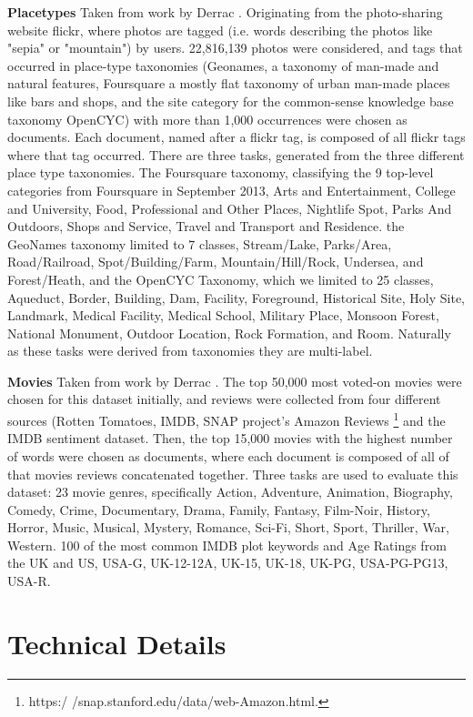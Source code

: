 \textbf{Placetypes} Taken from work by Derrac \cite{Derrac2015}. Originating from the photo-sharing website flickr, where photos are tagged (i.e. words describing the photos like "sepia" or "mountain") by users. 22,816,139 photos were considered, and tags that occurred in place-type taxonomies (Geonames, a taxonomy of man-made and natural features, Foursquare a mostly flat taxonomy of urban man-made places like bars and shops, and the site category for the common-sense knowledge base taxonomy OpenCYC) with more than 1,000 occurrences were chosen as documents. Each document, named after a flickr tag, is composed of all flickr tags where that tag occurred. There are three tasks, generated from the three different place type taxonomies. The Foursquare taxonomy, classifying the 9 top-level categories from Foursquare in September 2013, Arts and Entertainment, College and University, Food, Professional and Other Places, Nightlife Spot, Parks And Outdoors, Shops and Service, Travel and Transport and Residence. the GeoNames taxonomy limited to 7 classes, Stream/Lake, Parks/Area, Road/Railroad, Spot/Building/Farm, Mountain/Hill/Rock, Undersea, and Forest/Heath, and the OpenCYC Taxonomy, which we limited to 25 classes, Aqueduct, Border, Building, Dam, Facility, Foreground, Historical Site, Holy Site, Landmark, Medical Facility, Medical School, Military Place, Monsoon Forest, National Monument, Outdoor Location, Rock Formation, and Room. Naturally as these tasks were derived from taxonomies they are multi-label.\label{datasets:placetypes}

\textbf{Movies} Taken from work by Derrac \cite{Derrac2015}. The top 50,000 most voted-on movies were chosen for this dataset initially, and reviews were collected from four different sources (Rotten Tomatoes, IMDB, SNAP project's Amazon Reviews \footnote{https:/ /snap.stanford.edu/data/web-Amazon.html.} and the IMDB sentiment dataset. Then, the top 15,000 movies with the highest number of words were chosen as documents, where each document is composed of all of that movies reviews concatenated together. Three tasks are used to evaluate this dataset: 23 movie genres, specifically Action, Adventure, Animation, Biography, Comedy, Crime, Documentary, Drama, Family, Fantasy, Film-Noir, History, Horror, Music, Musical, Mystery, Romance, Sci-Fi, Short, Sport, Thriller, War, Western. 100 of the most common IMDB plot keywords and Age Ratings from the UK and US, USA-G, UK-12-12A, UK-15, UK-18, UK-PG, USA-PG-PG13, USA-R.\label{datasets:movies} 


\section{Technical Details}\label{ch2.5:technical}

